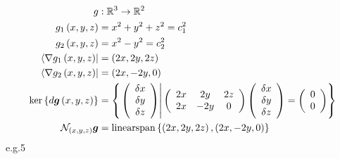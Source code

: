\documentclass[aps,preprint]{revtex4}%
\begin{document}
\begin{align}
g  &  :\mathbb{R}^{3}\rightarrow\mathbb{R}^{2}\nonumber\\
g_{1}\left(  x,y,z\right)   &  =x^{2}+y^{2}+z^{2}=c_{1}^{2}\nonumber\\
g_{2}\left(  x,y,z\right)   &  =x^{2}-y^{2}=c_{2}^{2}\nonumber\\
\left\langle \nabla g_{1}\left(  x,y,z\right)  \right\vert  &  =\left(
2x,2y,2z\right) \nonumber\\
\left\langle \nabla g_{2}\left(  x,y,z\right)  \right\vert  &  =\left(
2x,-2y,0\right) \nonumber\\
\ker\left\{  d\boldsymbol{g}\left(  x,y,z\right)  \right\}   &  =\left\{
\left.  \left(
\begin{array}
[c]{c}%
\delta x\\
\delta y\\
\delta z
\end{array}
\right)  \right\vert \left(
\begin{array}
[c]{ccc}%
2x & 2y & 2z\\
2x & -2y & 0
\end{array}
\right)  \left(
\begin{array}
[c]{c}%
\delta x\\
\delta y\\
\delta z
\end{array}
\right)  =\left(
\begin{array}
[c]{c}%
0\\
0
\end{array}
\right)  \right\} \nonumber\\
\mathcal{N}_{\left(  x,y,z\right)  }\boldsymbol{g}  &
=\operatorname*{linearspan}\left\{  \left(  2x,2y,2z\right)  ,\left(
2x,-2y,0\right)  \right\}
\end{align}
e.g.5%
\end{document}
